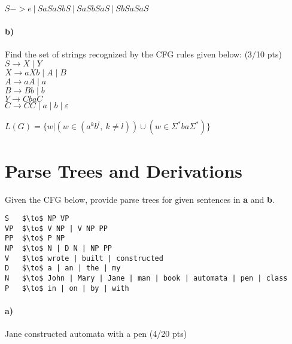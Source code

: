 \documentclass[a4paper,12pt]{article}
\begin{document}
\begin{tcolorbox}
$S-> e \ | \ SaSaSbS \ | \ SaSbSaS \ | \ SbSaSaS$
\end{tcolorbox}



\paragraph{b)} Find the set of strings recognized by the CFG rules given below:         \hfill \small{(3/10 pts)} \\


$S \to X \mid Y$ \\
$X \to aXb \mid A \mid B$ \\
$A \to aA \mid a$ \\
$B \to Bb \mid b$ \\
$Y \to CbaC$ \\
$C \to CC \mid a \mid b \mid \varepsilon$  \\

\begin{tcolorbox}
$L(G)=\{w|(w \in(a^kb^l, \ k\neq l)) \cup (w \in \Sigma^*ba \Sigma^*)\}$
\end{tcolorbox}


\newpage
\section{Parse Trees and Derivations \hfill {}}
Given the CFG below, provide parse trees for given sentences in \textbf{a} and \textbf{b}.\\

\begin{lstlisting}[style=output,mathescape=true]
S   $\to$ NP VP
VP  $\to$ V NP | V NP PP
PP  $\to$ P NP
NP  $\to$ N | D N | NP PP
V   $\to$ wrote | built | constructed
D   $\to$ a | an | the | my
N   $\to$ John | Mary | Jane | man | book | automata | pen | class
P   $\to$ in | on | by | with
\end{lstlisting}

\paragraph{a)} Jane constructed automata with a pen \hfill \small{(4/20 pts)} \\
\end{document}
